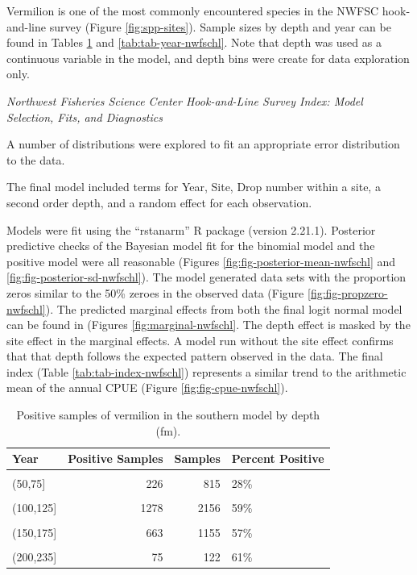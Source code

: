 \documentclass[
  english,
  a4paper,
]{article}
\begin{document}
Vermilion is one of the most commonly encountered species in the NWFSC hook-and-line survey (Figure \ref{fig:spp-sites}). Sample sizes by depth and year can be found in Tables
\ref{tab:tab-depth-nwfschl} and \ref{tab:tab-year-nwfschl}.
Note that depth was used as a continuous variable in the model, and depth bins were create for data exploration only.

\emph{Northwest Fisheries Science Center Hook-and-Line Survey Index: Model Selection, Fits, and Diagnostics}

A number of distributions were explored to fit an appropriate error distribution to
the data.

The final model included terms for Year, Site, Drop number within a site, a
second order depth, and a random effect for each observation.

Models were fit using the ``rstanarm'' R package (version 2.21.1). Posterior predictive
checks of the Bayesian model fit for the binomial model and the positive model
were all reasonable (Figures \ref{fig:fig-posterior-mean-nwfschl} and
\ref{fig:fig-posterior-sd-nwfschl}). The model generated data sets with the
proportion zeros similar to the 50\% zeroes in the observed data
(Figure \ref{fig:fig-propzero-nwfschl}). The predicted marginal effects from
both the final logit normal model can be found in (Figures \ref{fig:marginal-nwfschl}.
The depth effect is masked by the site effect in the marginal effects. A model
run without the site effect confirms that that depth follows the expected pattern
observed in the data.
The final index (Table \ref{tab:tab-index-nwfschl})
represents a similar trend to the arithmetic mean of the annual CPUE (Figure \ref{fig:fig-cpue-nwfschl}).

\newpage

\begin{table}

\caption{\label{tab:tab-depth-nwfschl}Positive samples of vermilion in the southern model by depth (fm).}
\centering
\begin{tabular}[t]{lrrl}
\toprule
Year & Positive Samples & Samples & Percent Positive\\
\midrule
\cellcolor{gray!6}{(0,50]} & \cellcolor{gray!6}{85} & \cellcolor{gray!6}{295} & \cellcolor{gray!6}{29\%}\\
(50,75] & 226 & 815 & 28\%\\
\cellcolor{gray!6}{(75,100]} & \cellcolor{gray!6}{1697} & \cellcolor{gray!6}{3847} & \cellcolor{gray!6}{44\%}\\
(100,125] & 1278 & 2156 & 59\%\\
\cellcolor{gray!6}{(125,150]} & \cellcolor{gray!6}{917} & \cellcolor{gray!6}{1594} & \cellcolor{gray!6}{58\%}\\
\addlinespace
(150,175] & 663 & 1155 & 57\%\\
\cellcolor{gray!6}{(175,200]} & \cellcolor{gray!6}{234} & \cellcolor{gray!6}{456} & \cellcolor{gray!6}{51\%}\\
(200,235] & 75 & 122 & 61\%\\
\bottomrule
\end{tabular}
\end{table}
\end{document}
